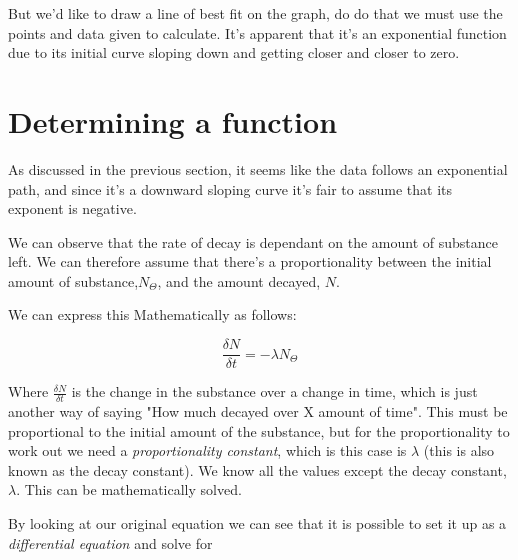 \documentclass[12pt]{article}
\begin{document}
                But we'd like to draw a line of best fit on the graph, do do that we must use the points and data given to calculate. It's apparent that it's an exponential function due to its initial curve sloping down and getting closer and closer to zero. 

                \section{Determining a function}

                As discussed in the previous section, it seems like the data follows an exponential path, and since it's a downward sloping curve it's fair to assume that its exponent is negative.
                
                \noindent
                We can observe that the rate of decay is dependant on the amount of substance left. We can therefore assume that there's a proportionality between the initial amount of substance,$N_\Theta$, and the amount decayed, $N$. 

                \noindent 
                We can express this Mathematically as follows:
                
                        $$\frac{\delta N}{\delta t} = -\lambda N_\Theta $$

                Where $\frac{\delta N}{\delta t}$ is the change in the substance over a change in time, which is just another way of saying "How much decayed over X amount of time". This must be proportional to the initial amount of the substance, but for the proportionality to work out we need a \textit{proportionality constant}, which is this case is $\lambda$ (this is also known as the decay constant). 
                \noindent
                We know all the values except the decay constant, $\lambda$. This can be mathematically solved.


                \noindent
                By looking at our original equation we can see that it is possible to set it up as a \textit{differential equation} and solve for 
        
\end{document}

